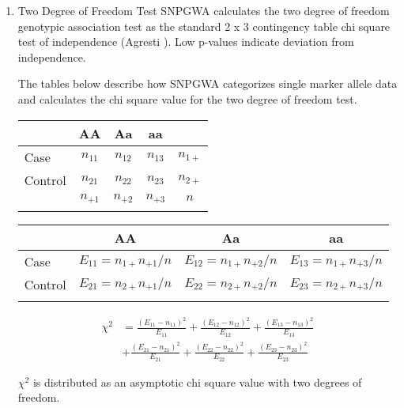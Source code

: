 \begin{enumerate}
\item{Two Degree of Freedom Test}
SNPGWA calculates the two degree of freedom genotypic association test as the
standard 2 x 3 contingency table chi square test of independence (Agresti
\cite{Agresti02}).  Low p-values indicate deviation from independence.

The tables below describe how SNPGWA categorizes single marker allele data and
calculates the chi square value for the two degree of freedom test.

\begin{center}
  \begin{tabular}{lcccc}
    \hline
    {}     & \textbf{AA} & \textbf{Aa} & \textbf{aa} & \\
    \hline
    Case    & $n_{11}$ & $n_{12}$ & $n_{13}$ & $n_{1+}$ \\
    Control & $n_{21}$ & $n_{22}$ & $n_{23}$ & $n_{2+}$ \\
    {}    & $n_{+1}$ & $n_{+2}$ & $n_{+3}$ & $n$     \\
    \hline
    \label{tab:n_tab}
  \end{tabular}
\end{center}

\begin{center}
  \begin{tabular}{lccc}
    \hline
    {} & \textbf{AA} & \textbf{Aa} & \textbf{aa} \\
    \hline
    Case    & $E_{11} = n_{1+}n_{+1}/n$ & $E_{12} = n_{1+}n_{+2}/n$ & $E_{13} = n_{1+}n_{+3}/n$ \\
    Control & $E_{21} = n_{2+}n_{+1}/n$ & $E_{22} = n_{2+}n_{+2}/n$ & $E_{23} = n_{2+}n_{+3}/n$ \\
    \hline
    \label{tab:e_tab}
  \end{tabular}
\end{center}

\begin{align*}
  \chi^2 &= \frac{(E_{11}-n_{11})^2}{E_{11}} + \frac{(E_{12}-n_{12})^2}{E_{12}} + \frac{(E_{13}-n_{13})^2}{E_{13}} \\
         &+ \frac{(E_{21}-n_{21})^2}{E_{21}} + \frac{(E_{22}-n_{22})^2}{E_{22}} + \frac{(E_{23}-n_{23})^2}{E_{23}}
\end{align*}

\noindent{}$\chi^2$ is distributed as an asymptotic chi square value with two
degrees of freedom.


\end{enumerate}
